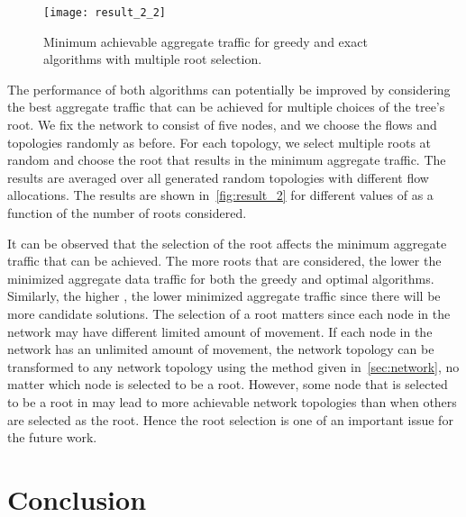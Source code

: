 \documentclass[10pt,conference]{IEEEtran}
\begin{document}
\begin{figure} \centering
 \texttt{[image: result\_2\_2]}
 \caption{Minimum achievable aggregate traffic for greedy and exact
   algorithms with multiple root selection.}
 \label{fig:result_2}
\end{figure}

The performance of both algorithms can potentially be improved by
considering the best aggregate traffic that can be achieved for
multiple choices of the tree's root.  We fix the network to consist of
five nodes, and we choose the flows and topologies randomly as before.
For each topology, we select multiple roots at random and choose the
root that results in the minimum aggregate traffic. The results are
averaged over all generated random topologies with different flow
allocations. The results are shown in~\autoref{fig:result_2} for
different values of  as a function of the number of roots
considered.

It can be observed that the selection of the root affects the minimum
aggregate traffic that can be achieved. The more roots that are
considered, the lower the minimized aggregate data traffic for both
the greedy and optimal algorithms.  Similarly, the higher ,
the lower minimized aggregate traffic since there will be more
candidate solutions.  The selection of a root matters since each node
in the network may have different limited amount of movement. If each
node in the network has an unlimited amount of movement, the network
topology can be transformed to any network topology using the method
given in~\autoref{sec:network}, no matter which node is selected to be
a root.  However, some node that is selected to be a root in
 may lead to more achievable network topologies than
when others are selected as the root. Hence the root selection is one
of an important issue for the future work.




\section{Conclusion}
\label{sec:con}
\end{document}
